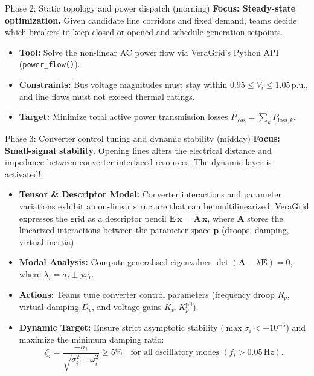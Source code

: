 \documentclass[11pt,a4paper]{article}
\begin{document}
\begin{challengebox}{Phase 2: Static topology and power dispatch (morning)}
  \textbf{Focus: Steady-state optimization.} Given candidate line corridors and fixed demand, teams decide which breakers to keep closed or opened and schedule generation setpoints.
  \begin{itemize}[leftmargin=*, itemsep=1pt]
    \item \textbf{Tool:} Solve the non-linear AC power flow via VeraGrid's Python API (\texttt{power\_flow()}).
    \item \textbf{Constraints:} Bus voltage magnitudes must stay within $0.95 \le V_i \le 1.05\,\text{p.u.}$, and line flows must not exceed thermal ratings.
    \item \textbf{Target:} Minimize total active power transmission losses $P_{\text{loss}} = \sum_{k} P_{\text{loss}, k}$.
  \end{itemize}
\end{challengebox}

\begin{challengebox}{Phase 3: Converter control tuning and dynamic stability (midday)}
  \textbf{Focus: Small-signal stability.} Opening lines alters the electrical distance and impedance between converter-interfaced resources. The dynamic layer is activated!
  \begin{itemize}[leftmargin=*, itemsep=1pt]
    \item \textbf{Tensor \& Descriptor Model:} Converter interactions and parameter variations exhibit a non-linear structure that can be multilinearized. VeraGrid expresses the grid as a descriptor pencil $\mathbf{E}\,\dot{\mathbf{x}} = \mathbf{A}\,\mathbf{x}$, where $\mathbf{A}$ stores the linearized interactions between the parameter space $\mathbf{p}$ (droops, damping, virtual inertia).
    \item \textbf{Modal Analysis:} Compute generalised eigenvalues $\det(\mathbf{A} - \lambda \mathbf{E}) = 0$, where $\lambda_i = \sigma_i \pm j\omega_i$.
    \item \textbf{Actions:} Teams tune converter control parameters (frequency droop $R_p$, virtual damping $D_v$, and voltage gains $K_v, K_p^{\text{pll}}$).
    \item \textbf{Dynamic Target:} Ensure strict asymptotic stability ($\max \sigma_i < -10^{-5}$) and maximize the minimum damping ratio:
          \begin{equation*}
            \zeta_i = \frac{-\sigma_i}{\sqrt{\sigma_i^2 + \omega_i^2}} \ge 5\% \quad \text{for all oscillatory modes } (f_i > 0.05\,\text{Hz}).
          \end{equation*}
  \end{itemize}
\end{challengebox}
\end{document}
